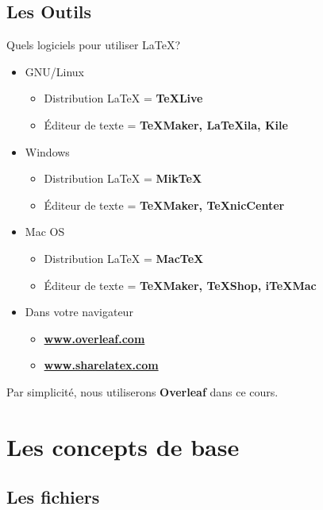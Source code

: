 \documentclass[10pt,svgnames,usenames,table]{beamer} %
\begin{document}
\subsection{Les Outils}
\begin{frame}{Quels logiciels pour utiliser \LaTeX{}?}

  \begin{itemize}
	  \item GNU/Linux
	  \begin{itemize}
	  	\item Distribution \LaTeX{} = \textbf{TeXLive}
		\item Éditeur de texte = \textbf{TeXMaker, LaTeXila, Kile}
	  \end{itemize}
	  \item Windows
	  \begin{itemize}
	  	\item Distribution \LaTeX{} = \textbf{MikTeX}
		\item Éditeur de texte = \textbf{TeXMaker, TeXnicCenter}
	  \end{itemize}
	  \item Mac OS
	  \begin{itemize}
	  	\item Distribution \LaTeX{} = \textbf{MacTeX}
		\item Éditeur de texte = \textbf{TeXMaker, TeXShop, iTeXMac}
	  \end{itemize}
	  \item Dans votre navigateur
	  \begin{itemize}
		\item \textbf{\url{www.overleaf.com}}
  		\item \textbf{\url{www.sharelatex.com}}
	  \end{itemize}
  \end{itemize}
  Par simplicité, nous utiliserons \textbf{Overleaf} dans ce cours.
\end{frame}

\section{Les concepts de base}
\subsection{Les fichiers}
\end{document}
